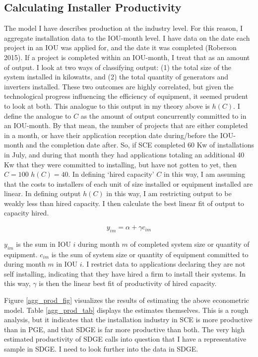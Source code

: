 \documentclass{article}
\begin{document}
\subsection{Calculating Installer Productivity}

The model I have describes production at the industry level. For this reason, I aggregate installation data to the IOU-month level. I have data on the date each project in an IOU was applied for, and the date it was completed (Roberson 2015). If a project is completed within an IOU-month, I treat that as an amount of output. I look at two ways of classifying output: (1) the total size of the system installed in kilowatts, and (2) the total quantity of generators and inverters installed. These two outcomes are highly correlated, but given the technological progress influencing the efficiency of equipment, it seemed prudent to look at both. This analogue to this output in my theory above is $h(C)$. I define the analogue to $C$ as the amount of output concurrently committed to in an IOU-month. By that mean, the number of projects that are either completed in a month, or have their application reception date during/before the IOU-month and the completion date after. So, if SCE completed 60 Kw of installations in July, and during that month they had applications totaling an additional 40 Kw that they were committed to installing, but have not gotten to yet, then $C= 100$ $h(C) = 40$.  In defining `hired capacity' $C$ in this way, I am assuming that the costs to installers of each unit of size installed or equipment installed are linear. In defining output $h(C)$ in this way, I am restricting output to be weakly less than hired capacity. I then calculate the best linear fit of output to capacity hired.

\[
y_{im} = \alpha + \gamma c_{im}
\]

$y_{im}$ is the sum in IOU $i$ during month $m$ of completed system size or quantity of equipment. $c_{im}$ is the sum of system size or quantity of equipment committed to during month $m$ in IOU $i$. I restrict data to applications declaring they are not self installing, indicating that they have hired a firm to install their systems. In this way, $\gamma$ is then the linear best fit of productivity of hired capacity.

Figure \ref{agg_prod_fig} visualizes the results of estimating the above econometric model. Table \ref{agg_prod_tab} displays the estimates themselves. This is a rough analysis, but it indicates that the installation industry in SCE is more productive than in PGE, and that SDGE is far more productive than both. The very high estimated productivity of SDGE calls into question that I have a representative sample in SDGE. I need to look further into the data in SDGE.
\end{document}
